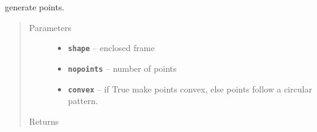 \documentclass[letterpaper,10pt,english]{sphinxmanual}
\begin{document}
\begin{fulllineitems}
\label{RRtoolbox.lib.arrayops:RRtoolbox.lib.arrayops.basic.points_generator}
generate points.
\begin{quote}\begin{description}
\item[{Parameters}] \leavevmode\begin{itemize}
\item {} 
\textbf{\texttt{shape}} -- enclosed frame

\item {} 
\textbf{\texttt{nopoints}} -- number of points

\item {} 
\textbf{\texttt{convex}} -- if True make points convex,
else points follow a circular pattern.

\end{itemize}

\item[{Returns}] \leavevmode


\end{description}\end{quote}

\end{fulllineitems}

\end{document}
